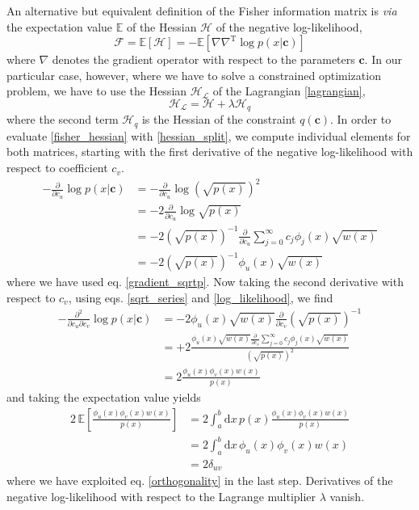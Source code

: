 \documentclass[]{report}
\begin{document}
		An alternative but equivalent definition of the Fisher information matrix is \textit{via} the expectation value $\mathbb{E}$ of the Hessian $\bm{\mathcal{H}}$ of the negative log-likelihood,
		\begin{equation}\label{fisher_hessian}
			\bm{\mathcal{F}} = \mathbb{E}\left[\bm{\mathcal{H}}\right] = -\mathbb{E}\left[\nabla\nabla^\mathrm{T}\log p(x\vert\mathbf{c})\right]
		\end{equation}
		where $\nabla$ denotes the gradient operator with respect to the parameters $\mathbf{c}$. In our particular case, however, where we have to solve a constrained optimization problem, we have to use the Hessian $\bm{\mathcal{H}}_\mathcal{L}$ of the Lagrangian \ref{lagrangian},
		\begin{equation}\label{hessian_split}
			\bm{\mathcal{H}}_\mathcal{L} = \bm{\mathcal{H}} + \lambda\bm{\mathcal{H}}_q
		\end{equation}
		where the second term $\bm{\mathcal{H}}_q$ is the Hessian of the constraint $q(\mathbf{c})$. In order to evaluate \ref{fisher_hessian} with \ref{hessian_split}, we compute individual elements for both matrices, starting with the first derivative of the negative log-likelihood with respect to coefficient $c_v$.
		\begin{align}\label{gradient_logp}
			-\frac{\partial}{\partial c_u}\log p(x\vert\mathbf{c}) & = -\frac{\partial}{\partial 	c_u}\log\left(\sqrt{p(x)}\right)^2 \nonumber \\
			& = -2\frac{\partial}{\partial c_u}\log\sqrt{p(x)} \\
			& = -2\left(\sqrt{p(x)}\right)^{-1}\frac{\partial}{\partial c_u}\sum_{j=0}^{\infty}c_j\phi_j(x)\sqrt{w(x)} \nonumber \\
			& = -2\left(\sqrt{p(x)}\right)^{-1}\phi_u(x)\sqrt{w(x)} \nonumber
		\end{align}
		where we have used eq. \ref{gradient_sqrtp}. Now taking the second derivative with respect to $c_v$, using eqs. \ref{sqrt_series} and \ref{log_likelihood}, we find
		\begin{align}\label{hessian_logp}
			-\frac{\partial^2}{\partial c_u\partial c_v}\log p(x\vert\mathbf{c}) & = -2\phi_u(x)\sqrt{w(x)}\frac{\partial}{\partial c_v}\left(\sqrt{p(x)}\right)^{-1} \nonumber \\
			& = +2\frac{\phi_u(x)\sqrt{w(x)}\frac{\partial}{\partial c_v}\sum_{j=0}^{\infty}c_j\phi_j(x)\sqrt{w(x)}}{\left(\sqrt{p(x)}\right)^{2}} \nonumber \\
			& = 2\frac{\phi_u(x)\phi_v(x)w(x)}{p(x)}
		\end{align}
		and taking the expectation value yields
		\begin{align}
			2\,\mathbb{E}\left[\frac{\phi_u(x)\phi_v(x)w(x)}{p(x)}\right] & = 	2\int_a^b\mathrm{d}x\,p(x)\frac{\phi_u(x)\phi_v(x)w(x)}{p(x)} \nonumber \\
			& = 2\int_a^b\mathrm{d}x\,\phi_u(x)\phi_v(x)w(x) \\
			& = 2\delta_{uv} \nonumber
		\end{align}
		where we have exploited eq. \ref{orthogonality} in the last step. Derivatives of the negative log-likelihood with respect to the Lagrange multiplier $\lambda$ vanish.
		
\end{document}
